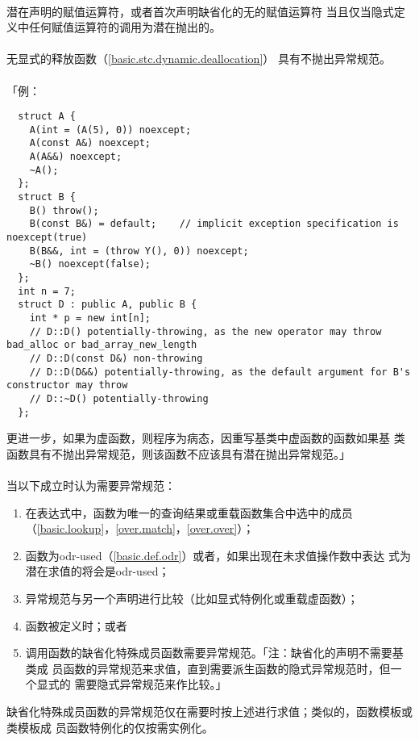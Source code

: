 \paragraph{}
潜在声明的赋值运算符，或者首次声明缺省化的无的赋值运算符
当且仅当隐式定义中任何赋值运算符的调用为潜在抛出的。

\paragraph{}
无显式的释放函数（\ref{basic.stc.dynamic.deallocation}）
具有不抛出异常规范。

\paragraph{}
「例：
\begin{lstlisting}
  struct A {
    A(int = (A(5), 0)) noexcept;
    A(const A&) noexcept;
    A(A&&) noexcept;
    ~A();
  };
  struct B {
    B() throw();
    B(const B&) = default;    // implicit exception specification is noexcept(true)
    B(B&&, int = (throw Y(), 0)) noexcept;
    ~B() noexcept(false);
  };
  int n = 7;
  struct D : public A, public B {
    int * p = new int[n];
    // D::D() potentially-throwing, as the new operator may throw bad_alloc or bad_array_new_length
    // D::D(const D&) non-throwing
    // D::D(D&&) potentially-throwing, as the default argument for B's constructor may throw
    // D::~D() potentially-throwing
  };
\end{lstlisting}
更进一步，如果为虚函数，则程序为病态，因重写基类中虚函数的函数如果基
类函数具有不抛出异常规范，则该函数不应该具有潜在抛出异常规范。」

\paragraph{}
当以下成立时认为需要异常规范：
\begin{enumerate}
  \item{在表达式中，函数为唯一的查询结果或重载函数集合中选中的成员
    （\ref{basic.lookup}，\ref{over.match}，\ref{over.over}）；}
  \item{函数为odr-used（\ref{basic.def.odr}）或者，如果出现在未求值操作数中表达
    式为潜在求值的将会是odr-used；}
  \item{异常规范与另一个声明进行比较（比如显式特例化或重载虚函数）；}
  \item{函数被定义时；或者}
  \item{调用函数的缺省化特殊成员函数需要异常规范。「注：缺省化的声明不需要基类成
    员函数的异常规范来求值，直到需要派生函数的隐式异常规范时，但一个显式的
    需要隐式异常规范来作比较。」}
\end{enumerate}
缺省化特殊成员函数的异常规范仅在需要时按上述进行求值；类似的，函数模板或类模板成
员函数特例化的仅按需实例化。

